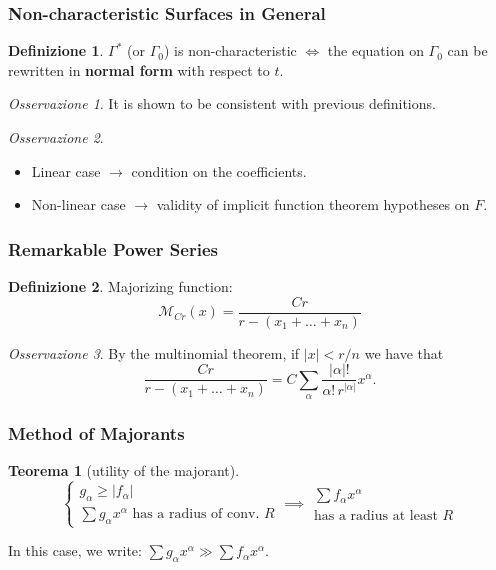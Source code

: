 \documentclass[serif,notheorems]{beamer}
\theoremstyle{definition} %
\newtheorem{theorem}{Teorema}[section] %
\newtheorem{definition}{Definizione}[section] %
\theoremstyle{remark}
\newtheorem*{remark}{Osservazione}
\begin{document}
\begin{frame}
\frametitle{Non-characteristic Surfaces in General}
\begin{definition}
$\Gamma^*$ (or $\Gamma_0$) is non-characteristic $\iff$ the equation on $\Gamma_0$ can be rewritten in \textbf{normal form} with respect to $t$.
\end{definition}
\begin{remark}
It is shown to be consistent with previous definitions.
\end{remark}
\begin{remark}
\begin{itemize}
\item Linear case $\rightarrow$ condition on the coefficients.
\item Non-linear case $\rightarrow$ validity of implicit function theorem hypotheses on $F$.
\end{itemize}
\end{remark}
\end{frame}

\begin{frame}
\frametitle{Remarkable Power Series}
\begin{definition}
Majorizing function: $$\mathcal{M}_{Cr}(x)=\frac{Cr}{r-(x_1+\ldots +x_n)}$$
\end{definition}
\begin{remark}
By the multinomial theorem, if $|x|<r/n$ we have that
$$\frac{Cr}{r-(x_1+\ldots +x_n)}=C \sum\limits_\alpha \frac{|\alpha |!}{\alpha ! \, r^{|\alpha |}} x^\alpha.$$
\end{remark}
\end{frame}

\begin{frame}
\frametitle{Method of Majorants}
\begin{theorem}[utility of the majorant]
\begin{equation*}
\begin{cases}
g_\alpha \geq |f_\alpha|\\
\sum g_\alpha x^\alpha \text{ has a radius of conv. } R
\end{cases}
\implies 
\begin{array}{c}
\sum f_\alpha x^\alpha \\
\text{has a radius at least } R
\end{array}
\end{equation*}
\end{theorem}
In this case, we write: $\sum g_\alpha x^\alpha \gg \sum f_\alpha x^\alpha$.
\end{frame}
\end{document}
